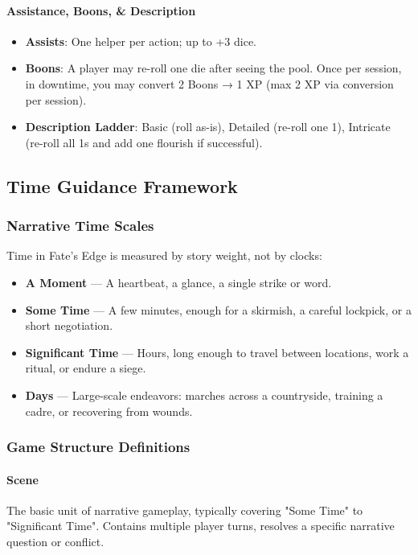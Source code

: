 \documentclass[11pt]{article}
\begin{document}
\paragraph{Assistance, Boons, \& Description}
\begin{itemize}
    \item \textbf{Assists}: One helper per action; up to +3 dice.
    \item \textbf{Boons}: A player may re-roll one die after seeing the pool. Once per session, in downtime, you may convert 2 Boons → 1 XP (max 2 XP via conversion per session).
    \item \textbf{Description Ladder}: Basic (roll as-is), Detailed (re-roll one 1), Intricate (re-roll all 1s and add one flourish if successful).
\end{itemize}

\subsection{Time Guidance Framework}

\subsubsection{Narrative Time Scales}
Time in Fate's Edge is measured by story weight, not by clocks:
\begin{itemize}
    \item \textbf{A Moment} — A heartbeat, a glance, a single strike or word.
    \item \textbf{Some Time} — A few minutes, enough for a skirmish, a careful lockpick, or a short negotiation.
    \item \textbf{Significant Time} — Hours, long enough to travel between locations, work a ritual, or endure a siege.
    \item \textbf{Days} — Large-scale endeavors: marches across a countryside, training a cadre, or recovering from wounds.
\end{itemize}

\subsubsection{Game Structure Definitions}

\paragraph{Scene}
The basic unit of narrative gameplay, typically covering "Some Time" to "Significant Time". Contains multiple player turns, resolves a specific narrative question or conflict.
\end{document}
